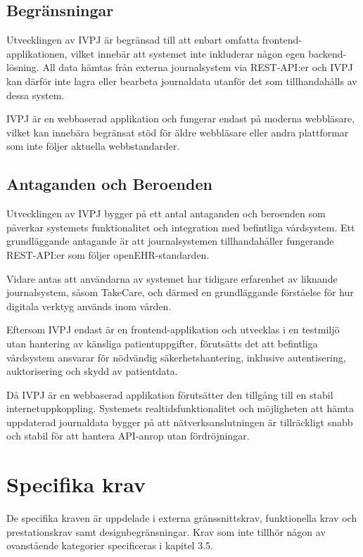 \documentclass{article}
\begin{document}
\subsection{Begränsningar}
Utvecklingen av IVPJ är begränsad till att enbart omfatta frontend-applikationen, vilket innebär att systemet inte inkluderar någon egen backend-lösning. All data hämtas från externa journalsystem via REST-API:er och IVPJ kan därför inte lagra eller bearbeta journaldata utanför det som tillhandahålls av dessa system.  

IVPJ är en webbaserad applikation och fungerar endast på moderna webbläsare, vilket kan innebära begränsat stöd för äldre webbläsare eller andra plattformar som inte följer aktuella webbstandarder.

\subsection{Antaganden och Beroenden}
Utvecklingen av IVPJ bygger på ett antal antaganden och beroenden som påverkar systemets funktionalitet och integration med befintliga vårdsystem. Ett grundläggande antagande är att journalsystemen tillhandahåller fungerande REST-API:er som följer openEHR-standarden.

Vidare antas att användarna av systemet har tidigare erfarenhet av liknande journalsystem, såsom TakeCare, och därmed en grundläggande förståelse för hur digitala verktyg används inom vården.

Eftersom IVPJ endast är en frontend-applikation och utvecklas i en testmiljö utan hantering av känsliga patientuppgifter, förutsätts det att befintliga vårdsystem ansvarar för nödvändig säkerhetshantering, inklusive autentisering, auktorisering och skydd av patientdata.

Då IVPJ är en webbaserad applikation förutsätter den tillgång till en stabil internetuppkoppling. Systemets realtidsfunktionalitet och möjligheten att hämta uppdaterad journaldata bygger på att nätverksanslutningen är tillräckligt snabb och stabil för att hantera API-anrop utan fördröjningar.

\newpage
\section{Specifika krav}
De specifika kraven är uppdelade i externa gränssnittskrav, funktionella krav och prestationskrav samt designbegränsningar. Krav som inte tillhör någon av ovanstående kategorier specificeras i kapitel 3.5.
\end{document}
